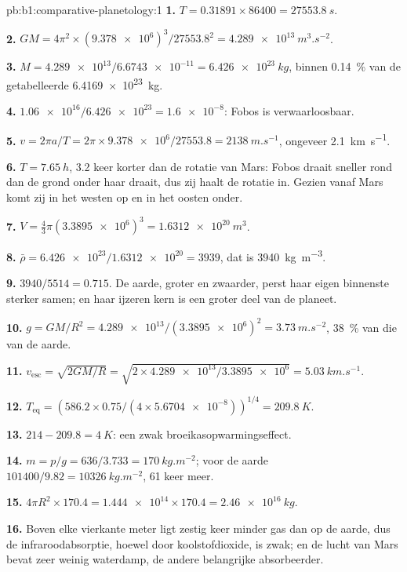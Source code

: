 \begin{solution}{pb:b1:comparative-planetology:1}
\textbf{1.} $T = 0.31891\times86400 = \qty{27553.8}{s}$.

\textbf{2.} $GM = 4\pi^2\times(\num{9.378e6})^3/\num{27553.8}^2 =
\qty{4.289e13}{m^3.s^{-2}}$.

\textbf{3.} $M = \num{4.289e13}/\num{6.6743e-11} = \qty{6.426e23}{kg}$,
binnen \qty{0.14}{\percent} van de getabelleerde \qty{6.4169e23}{kg}.

\textbf{4.} $\num{1.06e16}/\num{6.426e23} = \num{1.6e-8}$: Fobos is
verwaarloosbaar.

\textbf{5.} $v = 2\pi a/T = 2\pi\times\num{9.378e6}/27553.8 =
\qty{2138}{m.s^{-1}}$, ongeveer \qty{2.1}{km.s^{-1}}.

\textbf{6.} $T = \qty{7.65}{h}$, 3.2 keer korter dan de rotatie van Mars: Fobos draait sneller
rond dan de grond onder haar draait, dus zij haalt de rotatie in. Gezien vanaf Mars komt zij in het
westen op en in het oosten onder.

\textbf{7.} $V = \tfrac43\pi(\num{3.3895e6})^3 = \qty{1.6312e20}{m^3}$.

\textbf{8.} $\bar\rho = \num{6.426e23}/\num{1.6312e20} = 3939$, dat is
\qty{3940}{kg.m^{-3}}.

\textbf{9.} $3940/5514 = 0.715$. De aarde, groter en zwaarder, perst haar eigen binnenste sterker
samen; en haar ijzeren kern is een groter deel van de planeet.

\textbf{10.} $g = GM/R^2 = \num{4.289e13}/(\num{3.3895e6})^2 =
\qty{3.73}{m.s^{-2}}$, \qty{38}{\percent} van die van de aarde.

\textbf{11.} $v_\mathrm{esc} = \sqrt{2GM/R} = \sqrt{2\times\num{4.289e13}/
\num{3.3895e6}} = \qty{5.03}{km.s^{-1}}$.

\textbf{12.} $T_\mathrm{eq} = (586.2\times0.75/(4\times\num{5.6704e-8}))^{1/4}
= \qty{209.8}{K}$.

\textbf{13.} $214 - 209.8 = \qty{4}{K}$: een zwak broeikasopwarmingseffect.

\textbf{14.} $m = p/g = 636/3.733 = \qty{170}{kg.m^{-2}}$; voor de aarde
$101400/9.82 = \qty{10326}{kg.m^{-2}}$, 61 keer meer.

\textbf{15.} $4\pi R^2\times170.4 = \num{1.444e14}\times170.4 =
\qty{2.46e16}{kg}$.

\textbf{16.} Boven elke vierkante meter ligt zestig keer minder gas dan op de aarde, dus de
infraroodabsorptie, hoewel door koolstofdioxide, is zwak; en de lucht van Mars bevat zeer weinig
waterdamp, de andere belangrijke absorbeerder.


\end{solution}

